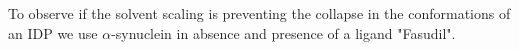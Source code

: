 To observe if the solvent scaling is preventing the collapse in the conformations of an IDP we use $\alpha$-synuclein in absence and presence of a ligand "Fasudil".
 
